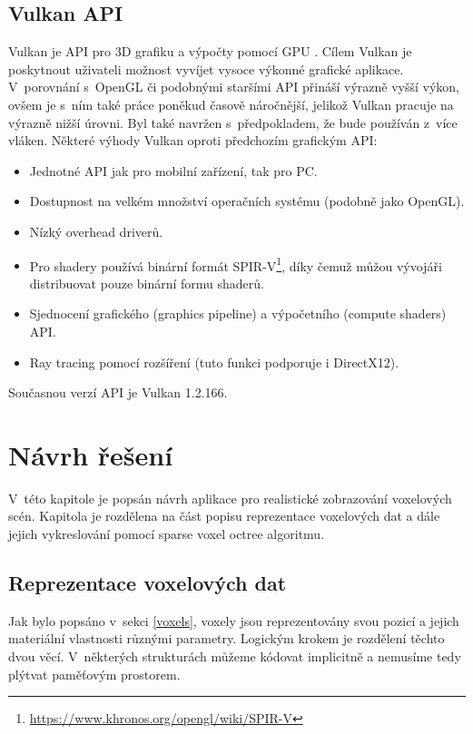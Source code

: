\section{Vulkan API}
Vulkan je API pro 3D grafiku a výpočty pomocí GPU \cite{vulkan_web}. Cílem Vulkan je poskytnout uživateli možnost vyvíjet vysoce výkonné grafické aplikace. V~porovnání s~OpenGL či podobnými staršími API přináší výrazně vyšší výkon, ovšem je s~ním také práce poněkud časově náročnější, jelikož Vulkan pracuje na výrazně nižší úrovni. Byl také navržen s~předpokladem, že bude používán z~více vláken. Některé výhody Vulkan oproti předchozím grafickým API:

\begin{itemize}
	\item Jednotné API jak pro mobilní zařízení, tak pro PC.
	\item Dostupnost na velkém množství operačních systému (podobně jako OpenGL).
	\item Nízký overhead driverů.
	\item Pro shadery používá binární formát SPIR-V\footnote{\url{https://www.khronos.org/opengl/wiki/SPIR-V}}, díky čemuž můžou vývojáři distribuovat pouze binární formu shaderů.
	\item Sjednocení grafického (graphics pipeline) a výpočetního (compute shaders) API.
	\item Ray tracing pomocí rozšíření (tuto funkci podporuje i DirectX12).
\end{itemize}

Současnou verzí API je Vulkan 1.2.166\cite{vulkanspec}.

\chapter{Návrh řešení}
\label{navrh}
V~této kapitole je popsán návrh aplikace pro realistické zobrazování voxelových scén. Kapitola je rozdělena na část popisu reprezentace voxelových dat a dále jejich vykreslování pomocí sparse voxel octree algoritmu.

\section{Reprezentace voxelových dat}\label{sec:voxel_representation}
Jak bylo popsáno v~sekci \ref{voxels}, voxely jsou reprezentovány svou pozicí a jejich materiální vlastnosti různými parametry. Logickým krokem je rozdělení těchto dvou věcí. V~některých strukturách můžeme kódovat implicitně a nemusíme tedy plýtvat paměťovým prostorem.

